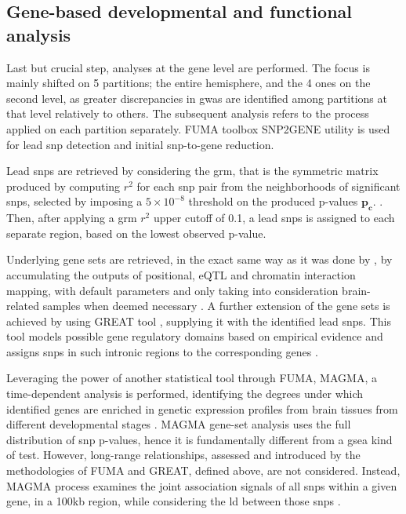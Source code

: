 \subsection{Gene-based developmental and functional analysis}
\label{subsec:func_mat_methods}
Last but crucial step, analyses at the gene level are performed. The focus is mainly shifted on 5 partitions; the entire hemisphere, and the 4 ones on the second level, as greater discrepancies in \ac{gwas} are identified among partitions at that level relatively to others. The subsequent analysis refers to the process applied on each partition separately. FUMA toolbox SNP2GENE  utility is used \cite{Watanabe2017} for lead \ac{snp} detection and initial \ac{snp}-to-gene reduction.

Lead \acp{snp} are retrieved by considering the \acf{grm}, that is the symmetric matrix produced by computing $r^2$ for each \ac{snp} pair from the neighborhoods of significant \acp{snp}, selected by imposing a $5\times 10 ^ {-8}$ threshold on the produced p-values $\mathbf{p_c}$. \cite{Watanabe2017}. Then, after applying a \ac{grm} $r^2$ upper cutoff of 0.1, a lead \acp{snp} is assigned to each separate region, based on the lowest observed p-value. 

Underlying gene sets are retrieved, in the exact same way as it was done by \citet{Sha2021}, by accumulating the outputs of positional, eQTL and chromatin interaction mapping, with default parameters and only taking into consideration brain-related samples when deemed necessary \cite{Sha2021,Watanabe2017}.  A further extension of the gene sets is achieved by using GREAT tool \cite{McLean2010}, supplying it with the identified lead \acp{snp}. This tool models possible gene regulatory domains based on empirical evidence and assigns \acp{snp} in such intronic regions to the corresponding genes \cite{McLean2010}.

Leveraging the power of another statistical tool through FUMA, MAGMA, a time-dependent analysis is performed, identifying the degrees under which identified genes are enriched in genetic expression profiles from brain tissues from different developmental stages \cite{DeLeeuw2015}. MAGMA gene-set analysis uses the full distribution of \ac{snp} p-values, hence it is fundamentally different from a \ac{gsea} kind of test. However, long-range relationships, assessed and introduced by the methodologies of FUMA and GREAT, defined above, are not considered. Instead, MAGMA process examines the joint association signals of all \acp{snp} within a given gene, in a 100kb region, while considering the \ac{ld} between those \acp{snp} \cite{DeLeeuw2015,Sha2021}.


